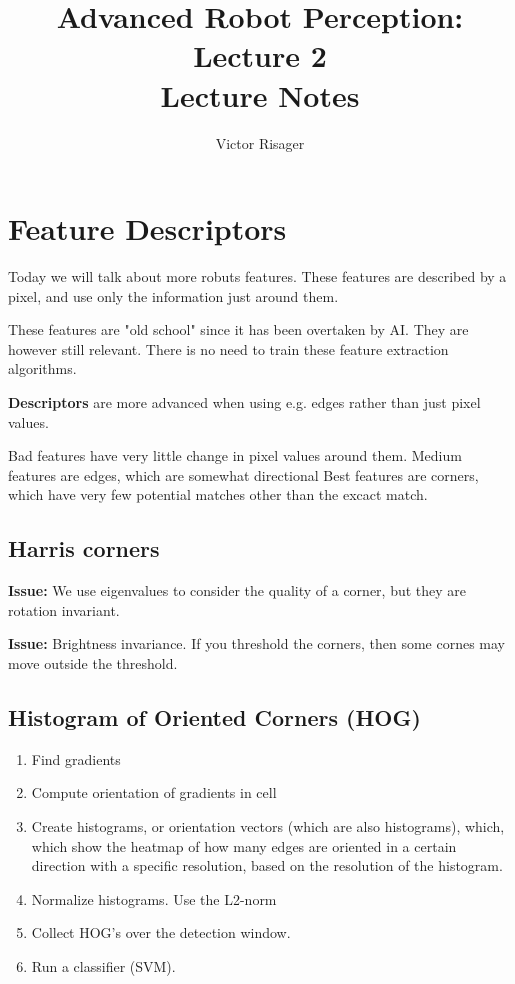 \documentclass[a4paper]{article}
\title{Advanced Robot Perception: Lecture 2 \\
	\large Lecture Notes}
\author{Victor Risager}
\begin{document}
\maketitle

\section{Feature Descriptors}
Today we will talk about more robuts features. These features are described by a pixel, and use only the information just around them.

These features are "old school" since it has been overtaken by AI. 
They are however still relevant. There is no need to train these feature extraction algorithms. 

\vspace{5pt}

\textbf{Descriptors} are more advanced when using e.g. edges rather than just pixel values. 

Bad features have very little change in pixel values around them. 
Medium features are edges, which are somewhat directional
Best features are corners, which have very few potential matches other than the excact match.


\subsection{Harris corners}

\textbf{Issue:}  We use eigenvalues to consider the quality of a corner, but they are rotation invariant. 

\textbf{Issue:} Brightness invariance. If you threshold the corners, then some cornes may move outside the threshold. 


\subsection{Histogram of Oriented Corners (HOG)}

\begin{enumerate}
	\item Find gradients
	\item Compute orientation of gradients in cell
	\item Create histograms, or orientation vectors (which are also histograms), which, which show the heatmap of how many edges are oriented in a certain direction with a specific resolution, based on the resolution of the histogram. 
	\item Normalize histograms. Use the L2-norm
	\item Collect HOG's over the detection window. 
	\item Run a classifier (SVM). 
\end{enumerate}
\end{document}
